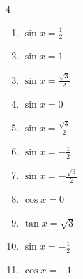 \begin{multicols}{4}
\begin{enumerate}

  \item $\displaystyle \sin{x}  = \frac{1}{2}$


  \item $\displaystyle \sin{x}  = 1$


  \item $\displaystyle \sin{x}  = \frac{\sqrt{3}}{2}$


  \item $\displaystyle \sin{x}  = 0$

        \phantom{$\displaystyle x = 0 , \pi$}

  \item $\displaystyle \sin{x}  = \frac{\sqrt{3}}{2}$


  \item $\displaystyle \sin{x}  = -\frac{1}{2}$


  \item $\displaystyle \sin{x}  = -\frac{\sqrt{3}}{2}$


\columnbreak %

  \item $\displaystyle \cos{x}  = 0$


  \item $\displaystyle \tan{x}  = \sqrt{3}$


  \item $\displaystyle \sin{x}  = -\frac{1}{2}$


  \item $\displaystyle \cos{x}  = -1$


\end{enumerate}
\end{multicols}
